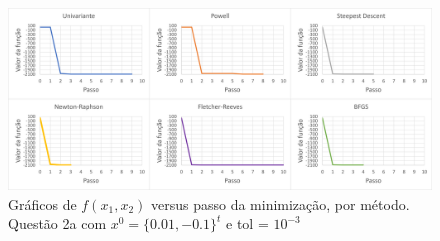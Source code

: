 \documentclass[10pt, a4paper]{article}
\begin{document}
\begin{figure}[H]
  \centering
  \includegraphics[scale=0.45]{figuras/q2a_fxpassos_P1.PNG}
  \caption{Gráficos de $f(x_1,x_2)$ versus passo da minimização, por método. Questão 2a com $x^0 = \{0.01,-0.1\}^t$ e tol = $10^{-3}$}
\end{figure}
\end{document}
